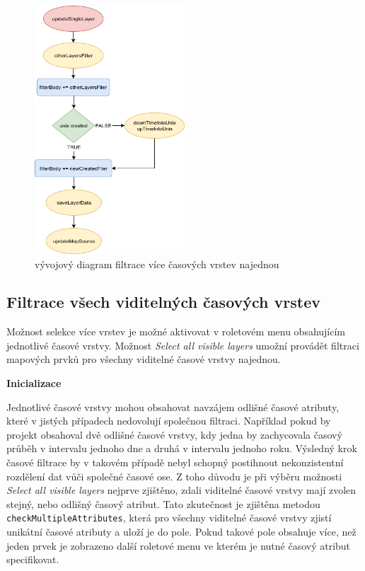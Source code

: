 \begin{figure}[h!]
	\centering \includegraphics[width=0.5\textwidth]{../img/getSingleLayer.png} \caption{vývojový
	diagram filtrace více časových vrstev
	najednou} \label{fig:single-chart}
\end{figure}

\subsection{Filtrace všech viditelných časových vrstev}

Možnost selekce více vrstev je možné aktivovat v roletovém menu
obsahujícím jednotlivé časové vrstvy. Možnost \textit{Select all
visible layers} umožní provádět filtraci mapových prvků pro všechny
viditelné časové vrstvy najednou.

\bigskip
\noindent \textbf{Inicializace}

Jednotlivé časové vrstvy mohou obsahovat navzájem odlišné časové
atributy, které v jistých případech nedovolují společnou
filtraci. Například pokud by projekt obsahoval dvě odlišné časové
vrstvy, kdy jedna by zachycovala časový průběh v intervalu jednoho dne
a druhá v intervalu jednoho roku. Výsledný krok časové filtrace by v
takovém případě nebyl schopný postihnout nekonzistentní rozdělení dat
vůči společné časové ose. Z toho důvodu je při výběru
možnosti \textit{Select all visible layers} nejprve zjištěno, zdali
viditelné časové vrstvy mají zvolen stejný, nebo odlišný časový
atribut. Tato zkutečnost je zjištěna
metodou \verb|checkMultipleAttributes|, která pro všechny viditelné
časové vrstvy zjistí unikátní časové atributy a uloží je do
pole. Pokud takové pole obsahuje více, než jeden prvek je zobrazeno
další roletové menu ve kterém je nutné časový atribut specifikovat.

